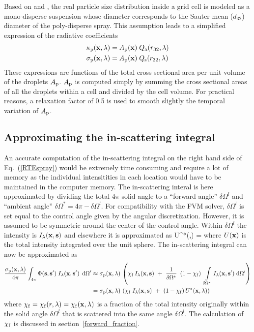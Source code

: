 Based on \cite{Collin} and \cite{Maruyama}, the real particle size distribution inside a grid cell is modeled as a mono-disperse suspension
whose diameter corresponds to the Sauter mean ($d_{32}$) diameter of the poly-disperse spray.
This assumption leads to a simplified expression of the radiative coefficients
\begin{align}
\kappa_{\rm p}({\mathbf{x}},\lambda) &= A_{\rm p}({\mathbf{x}}) \; Q_{\rm a}(r_{32},\lambda) \\
\sigma_{\rm p}({\mathbf{x}},\lambda) &= A_{\rm p}({\mathbf{x}}) \; Q_{\rm s}(r_{32},\lambda)
\end{align}
These expressions are functions of the total cross sectional area per unit volume of the droplets $A_{\rm p}$. $A_{\rm p}$ is computed simply by summing the cross sectional areas of all the droplets within a cell and divided by the cell volume. For practical reasons, a relaxation factor of 0.5 is
used to smooth slightly the temporal variation of $A_{\rm p}$.

\subsection{Approximating the in-scattering integral}

An accurate computation of the in-scattering integral on the right hand side of Eq.~(\ref{RTEspray}) would be extremely time
consuming and require a lot of memory as the individual intensitities in each location would have to be maintained in the computer memory.
The in-scattering interal is here approximated by dividing the total $4\pi$ solid angle to a ``forward angle'' $\delta\Omega^l$ and ``ambient angle''
$\delta\Omega^*=4\pi - \delta\Omega^l$.  For compatibility with the FVM solver, $\delta\Omega^l$ is set equal to the control angle given
by the angular discretization.  However, it is assumed to be symmetric around the center of the control angle.  Within $\delta\Omega^l$ the
intensity is $I_{\lambda}({\mathbf{x}},{\mathbf{s}})$ and elsewhere it is approximated as
\be
\label{Ustar}
U^*(\bx,\la) = 
\ee
where $U({\mathbf{x}})$ is the total intensity integrated over the unit sphere. The in-scattering
integral can now be approximated as
\begin{align}
\notag \frac{\sigma_{\rm p}({\mathbf{x}},\lambda)}{4\pi}\int_{4\pi}\Phi({\mathbf{s}},{\mathbf{s}}') \; I_{\lambda}({\mathbf{x}},{\mathbf{s}}')
  \; \,\mathrm{d}\Omega'
  &\approx
\sigma_{\rm p}({\mathbf{x}},\lambda) \, \left( \chi_{\rm f} \, I_{\lambda}({\mathbf{x}},{\mathbf{s}}) ~+~\frac{1}{\delta\Omega^{*}}~\left(1-\chi_{\rm f}\right)~
\int\limits_{\delta\Omega^{*}} I_{\lambda}({\mathbf{x}},{\mathbf{s}}') \; \textrm{d} \Omega' \right)\\
  &=
\sigma_{\rm p}({\mathbf{x}},\lambda) \, \left( \chi_{\rm f} \; I_{\lambda}({\mathbf{x}},{\mathbf{s}}) ~+~
(1-\chi_{\rm f}) \, U^*({\mathbf{x}},\lambda) \right)
\label{SprayRTE_RHS}
\end{align}
where $\chi_{\rm f} = \chi_{\rm f}(r,\lambda)=\chi_{\rm f}({\mathbf{x}},\lambda)$ is a fraction of the total intensity originally within the solid angle $\delta\Omega^l$ that is scattered
into the same angle $\delta\Omega^l$. The calculation of $\chi_{\rm f}$ is discussed in section~\ref{forward_fraction}.

